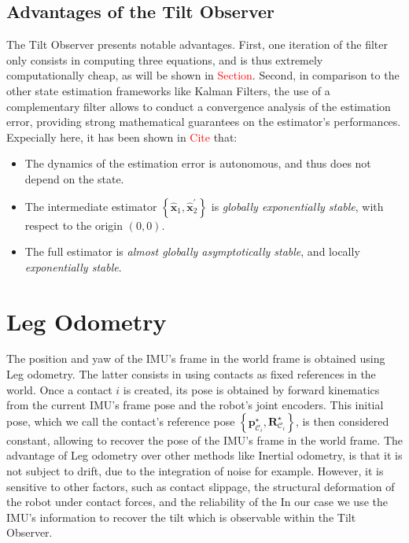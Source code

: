 \documentclass{IJCAS}
\begin{document}
\subsection{Advantages of the Tilt Observer}
The Tilt Observer presents notable advantages. First, one iteration of the filter only consists in computing three equations, and is thus extremely computationally cheap, as will be shown in \textcolor{red}{Section}. Second, in comparison to the other state estimation frameworks like Kalman Filters, the use of a complementary filter allows to conduct a convergence analysis of the estimation error, providing strong mathematical guarantees on the estimator's performances. Expecially here, it has been shown in \textcolor{red}{Cite} that:
\begin{itemize}
    \item The dynamics of the estimation error is autonomous, and thus does not depend on the state. 
    \item The intermediate estimator $\left\{\hat{\boldsymbol{x}}_{1}, \hat{\boldsymbol{x}}_{2}^{\prime} \right\}$ is \emph{globally exponentially stable}, with respect to the origin $\left(0,0\right)$.
    \item The full estimator is \emph{almost globally asymptotically stable}, and locally \emph{exponentially stable}.
\end{itemize}

\section{Leg Odometry}

The position and yaw of the IMU's frame in the world frame is obtained using Leg odometry. The latter consists in using contacts as fixed references in the world. Once a contact $i$ is created, its pose is obtained by forward kinematics from the current IMU's frame pose and the robot's joint encoders. This initial pose, which we call the contact's reference pose $\left\{ \boldsymbol{p}^{\star}_{\mathcal{C}_{i}}, \boldsymbol{R}^{\star}_{\mathcal{C}_{i}}\right\}$, is then considered constant, allowing to recover the pose of the IMU's frame in the world frame. The advantage of Leg odometry over other methods like Inertial odometry, is that it is not subject to drift, due to the integration of noise for example. However, it is sensitive to other factors, such as contact slippage, the structural deformation of the robot under contact forces, and the reliability of the   In our case we use the IMU's information to recover the tilt which is observable within the Tilt Observer.
\end{document}

